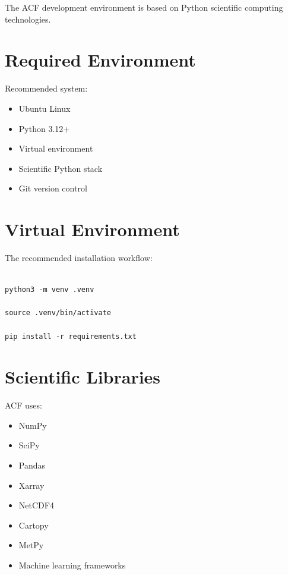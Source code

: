 The ACF development environment is based on Python scientific
computing technologies.


\section{Required Environment}

Recommended system:

\begin{itemize}

\item Ubuntu Linux

\item Python 3.12+

\item Virtual environment

\item Scientific Python stack

\item Git version control

\end{itemize}



\section{Virtual Environment}


The recommended installation workflow:


\begin{verbatim}

python3 -m venv .venv

source .venv/bin/activate

pip install -r requirements.txt

\end{verbatim}



\section{Scientific Libraries}


ACF uses:

\begin{itemize}

\item NumPy

\item SciPy

\item Pandas

\item Xarray

\item NetCDF4

\item Cartopy

\item MetPy

\item Machine learning frameworks

\end{itemize}
